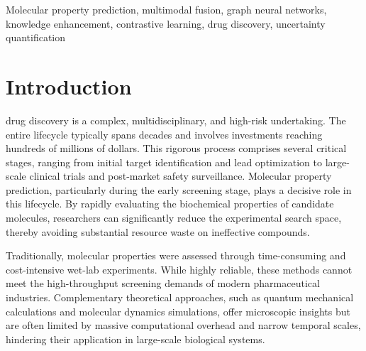 \documentclass[journal]{IEEEtran}
\begin{document}
\begin{IEEEkeywords}
Molecular property prediction, multimodal fusion, graph neural networks,
knowledge enhancement, contrastive learning, drug discovery, uncertainty quantification
\end{IEEEkeywords}






%
\IEEEpeerreviewmaketitle



\section{Introduction}
% 
% 
% 
% 


 drug discovery is a complex, multidisciplinary, and high-risk undertaking. The entire lifecycle typically spans decades and involves investments reaching hundreds of millions of dollars. This rigorous process comprises several critical stages, ranging from initial target identification and lead optimization to large-scale clinical trials and post-market safety surveillance. Molecular property prediction, particularly during the early screening stage, plays a decisive role in this lifecycle. By rapidly evaluating the biochemical properties of candidate molecules, researchers can significantly reduce the experimental search space, thereby avoiding substantial resource waste on ineffective compounds.

Traditionally, molecular properties were assessed through time-consuming and cost-intensive wet-lab experiments. While highly reliable, these methods cannot meet the high-throughput screening demands of modern pharmaceutical industries. Complementary theoretical approaches, such as quantum mechanical calculations and molecular dynamics simulations, offer microscopic insights but are often limited by massive computational overhead and narrow temporal scales, hindering their application in large-scale biological systems.
\end{document}
